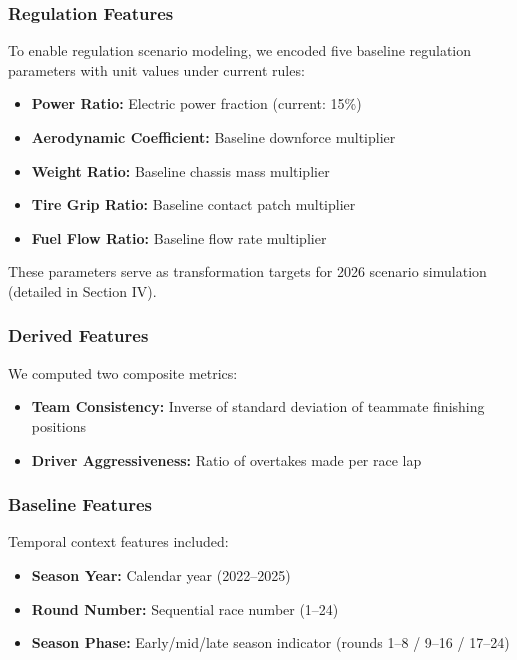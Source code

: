 \documentclass[conference]{IEEEtran}
\begin{document}
\subsubsection{Regulation Features}

To enable regulation scenario modeling, we encoded five baseline regulation parameters with unit values under current rules:

\begin{itemize}
    \item \textbf{Power Ratio:} Electric power fraction (current: 15\%)
    \item \textbf{Aerodynamic Coefficient:} Baseline downforce multiplier
    \item \textbf{Weight Ratio:} Baseline chassis mass multiplier
    \item \textbf{Tire Grip Ratio:} Baseline contact patch multiplier
    \item \textbf{Fuel Flow Ratio:} Baseline flow rate multiplier
\end{itemize}

These parameters serve as transformation targets for 2026 scenario simulation (detailed in Section IV).

\subsubsection{Derived Features}

We computed two composite metrics:

\begin{itemize}
    \item \textbf{Team Consistency:} Inverse of standard deviation of teammate finishing positions
    \item \textbf{Driver Aggressiveness:} Ratio of overtakes made per race lap
\end{itemize}

\subsubsection{Baseline Features}

Temporal context features included:
\begin{itemize}
    \item \textbf{Season Year:} Calendar year (2022--2025)
    \item \textbf{Round Number:} Sequential race number (1--24)
    \item \textbf{Season Phase:} Early/mid/late season indicator (rounds 1--8 / 9--16 / 17--24)
\end{itemize}
\end{document}
